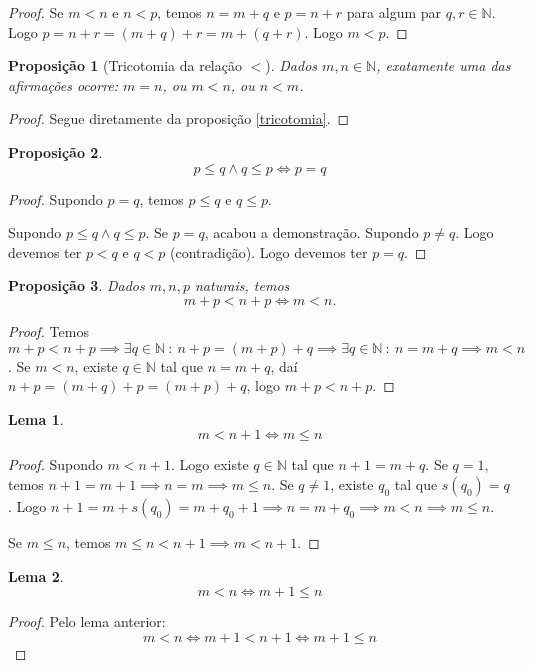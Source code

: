 \documentclass{article}
\theoremstyle{plain}
\newtheorem{prop}{Proposição}[section]
\newtheorem{lema}{Lema}
\theoremstyle{definition}
\theoremstyle{remark}
\begin{document}
\begin{proof}
	Se $m<n$ e $n<p$, temos $n = m+q$ e $p = n+r$ para algum par $q,r\in \mathbb{N}$. Logo $p = n +r = (m +q) +r =m +(q+r)$. Logo $m<p$.
\end{proof}
\begin{prop}[Tricotomia da relação $<$]
	Dados $m,n\in \mathbb{N}$, exatamente uma das afirmações ocorre: $m=n$, ou $m<n$, ou $n<m$.
\end{prop}
\begin{proof}
	Segue diretamente da proposição \ref{tricotomia}.
\end{proof}
\begin{prop}
	$$ p\leq q \land q \leq p \iff  p = q$$
\end{prop}
\begin{proof}
	Supondo $p = q$, temos $p\leq q $ e $q \leq p$. 

	Supondo $p\leq q \land q\leq p$. Se $p=q$, acabou a demonstração. Supondo $p\neq q$. Logo devemos ter $p <q $ e $q <p$ (contradição). Logo devemos ter $p=q$.

\end{proof}
\begin{prop}
	Dados $m,n,p$ naturais, temos $$m +p < n+p \iff m <n.$$
\end{prop}
\begin{proof}
	Temos $m+p < n+p \implies \exists q \in \mathbb{N} \: : \: n+p = (m+p) + q \implies  \exists q \in \mathbb{N} \: : \: n = m + q \implies m<n$.
	Se $m < n$, existe $q \in \mathbb{N}$ tal que $n = m+q$, daí $n+p = (m+q) + p = (m+p) + q$, logo $ m+ p < n+p$.
\end{proof}
\begin{lema}
	\label{lemaDesigualdade}
	$$ m < n+1 \iff m \leq n$$
\end{lema}
\begin{proof}
	Supondo $m<n+1$. Logo existe $q\in \mathbb{N}$ tal que $n+1 = m+q$. Se $q = 1$, temos $n+1  = m+1 \implies n = m \implies m \leq n$. Se $q\neq 1$, existe $q_0$ tal que $s(q_0) = q$. Logo $n+1 = m+s(q_0) = m+q_0+1\implies n = m+q_0 \implies m< n \implies m \leq n$. 

	Se $m \leq n$, temos $m\leq n < n+1 \implies m<n+1$.
\end{proof}
\begin{lema}
	$$ m < n \iff m +1\leq n$$
\end{lema}
\begin{proof}
	Pelo lema anterior:
	$$m < n \iff m+1  < n+1 \iff m+1 \leq n $$

\end{proof}
\end{document}
